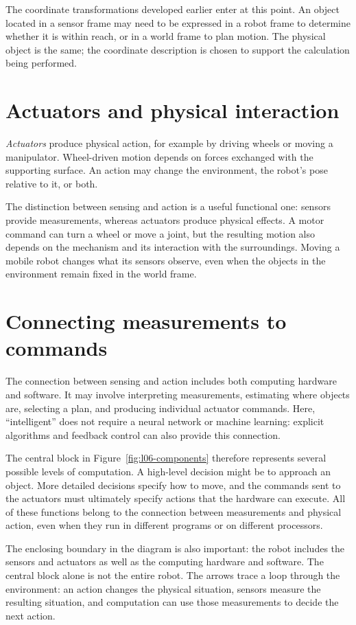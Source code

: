 The coordinate transformations developed earlier enter at this point. An
object located in a sensor frame may need to be expressed in a robot frame
to determine whether it is within reach, or in a world frame to plan motion.
The physical object is the same; the coordinate description is chosen to
support the calculation being performed.

\section{Actuators and physical interaction}
\emph{Actuators} produce physical action, for example by driving wheels or
moving a manipulator. Wheel-driven motion depends on forces exchanged with
the supporting surface. An action may change the environment, the robot's
pose relative to it, or both.

The distinction between sensing and action is a useful functional one:
sensors provide measurements, whereas actuators produce physical effects.
A motor command can turn a wheel or move a joint, but the resulting motion
also depends on the mechanism and its interaction with the surroundings.
Moving a mobile robot changes what its sensors observe, even when the objects
in the environment remain fixed in the world frame.

\section{Connecting measurements to commands}
The connection between sensing and action includes both computing hardware
and software. It may involve interpreting measurements, estimating where
objects are, selecting a plan, and producing individual actuator commands.
Here, ``intelligent'' does not require a neural network or machine learning:
explicit algorithms and feedback control can also provide this connection.

The central block in Figure~\ref{fig:l06-components} therefore represents
several possible levels of computation. A high-level decision might be to
approach an object. More detailed decisions specify how to move, and the
commands sent to the actuators must ultimately specify actions that the
hardware can execute. All of these functions belong to the connection
between measurements and physical action, even when they run in different
programs or on different processors.

The enclosing boundary in the diagram is also important: the robot includes
the sensors and actuators as well as the computing hardware and software.
The central block alone is not the entire robot. The arrows trace a loop
through the environment: an action changes the physical situation, sensors
measure the resulting situation, and computation can use those measurements
to decide the next action.

